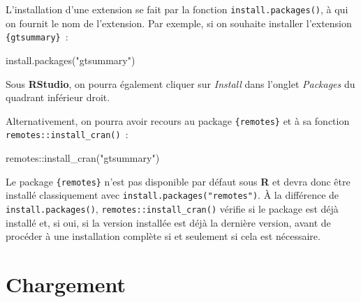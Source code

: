 \documentclass[
  letterpaper,
  DIV=11,
  numbers=noendperiod,
  oneside]{scrreprt}
\newenvironment{Shaded}{\begin{snugshade}}{\end{snugshade}}
\newcommand{\FunctionTok}[1]{\textcolor[rgb]{0.28,0.35,0.67}{#1}}
\newcommand{\NormalTok}[1]{\textcolor[rgb]{0.00,0.23,0.31}{#1}}
\newcommand{\SpecialCharTok}[1]{\textcolor[rgb]{0.37,0.37,0.37}{#1}}
\newcommand{\StringTok}[1]{\textcolor[rgb]{0.13,0.47,0.30}{#1}}
\begin{document}
L'installation d'une extension se fait par la fonction
\texttt{install.packages()}, à qui on fournit le nom de l'extension. Par
exemple, si on souhaite installer l'extension \texttt{\{gtsummary\}}~:

\begin{Shaded}
\begin{Highlighting}[]
\FunctionTok{install.packages}\NormalTok{(}\StringTok{"gtsummary"}\NormalTok{)}
\end{Highlighting}
\end{Shaded}

Sous \textbf{RStudio}, on pourra également cliquer sur \emph{Install}
dans l'onglet \emph{Packages} du quadrant inférieur droit.

Alternativement, on pourra avoir recours au package \texttt{\{remotes\}}
et à sa fonction \texttt{remotes::install\_cran()}~:

\begin{Shaded}
\begin{Highlighting}[]
\NormalTok{remotes}\SpecialCharTok{::}\FunctionTok{install\_cran}\NormalTok{(}\StringTok{"gtsummary"}\NormalTok{)}
\end{Highlighting}
\end{Shaded}

\begin{tcolorbox}[enhanced jigsaw, colbacktitle=quarto-callout-note-color!10!white, opacityback=0, toprule=.15mm, colback=white, coltitle=black, bottomtitle=1mm, toptitle=1mm, titlerule=0mm, rightrule=.15mm, title=\textcolor{quarto-callout-note-color}{\faInfo}\hspace{0.5em}{Note}, breakable, bottomrule=.15mm, opacitybacktitle=0.6, arc=.35mm, left=2mm, leftrule=.75mm, colframe=quarto-callout-note-color-frame]

Le package \texttt{\{remotes\}} n'est pas disponible par défaut sous
\textbf{R} et devra donc être installé classiquement avec
\texttt{install.packages("remotes")}. À la différence de
\texttt{install.packages()}, \texttt{remotes::install\_cran()} vérifie
si le package est déjà installé et, si oui, si la version installée est
déjà la dernière version, avant de procéder à une installation complète
si et seulement si cela est nécessaire.

\end{tcolorbox}

\hypertarget{chargement}{%
\section{Chargement}\label{chargement}}
\end{document}
